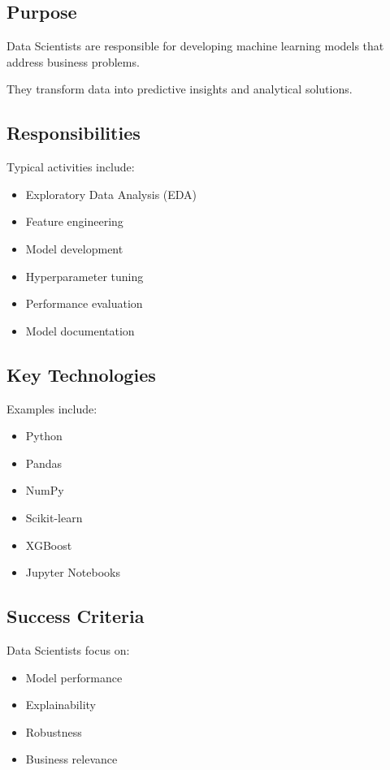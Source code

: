 \subsection{Purpose}

Data Scientists are responsible for developing machine learning models that address business problems.

They transform data into predictive insights and analytical solutions.

\subsection{Responsibilities}

Typical activities include:

\begin{itemize}
    \item Exploratory Data Analysis (EDA)
    \item Feature engineering
    \item Model development
    \item Hyperparameter tuning
    \item Performance evaluation
    \item Model documentation
\end{itemize}

\subsection{Key Technologies}

Examples include:

\begin{itemize}
    \item Python
    \item Pandas
    \item NumPy
    \item Scikit-learn
    \item XGBoost
    \item Jupyter Notebooks
\end{itemize}

\subsection{Success Criteria}

Data Scientists focus on:

\begin{itemize}
    \item Model performance
    \item Explainability
    \item Robustness
    \item Business relevance
\end{itemize}

